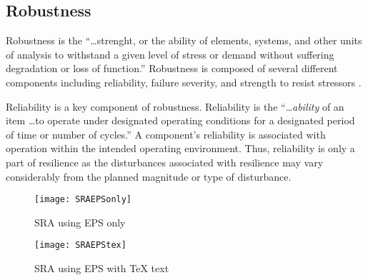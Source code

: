 


\subsection{Robustness}
Robustness is the ``\ldots strenght, or the ability of elements,
systems, and other units of analysis to withstand a given level of
stress or demand without suffering degradation or loss of function.''
Robustness is composed of several different components including
reliability, failure severity, and strength to resist
stressors \cite{Bruneau2003}.

Reliability is a key component of robustness. Reliability is the
``\ldots \emph{ability} of an item \ldots to operate under designated
operating conditions for a designated period of time or number of
cycles.'' A component's reliability is associated with operation
within the intended operating environment. Thus, reliability is only a
part of resilience as the disturbances associated with resilience may
vary considerably from the planned magnitude or type of
disturbance.
\begin{figure}
  \centering
  \texttt{[image: SRAEPSonly]}
  \label{fig:SRAEPSonly}
  \caption{SRA using EPS only}
\end{figure}

\begin{figure}
  \centering
  \texttt{[image: SRAEPStex]}
  \label{fig:SRAEPStex}
  \caption{SRA using EPS with TeX text}
\end{figure}





  
